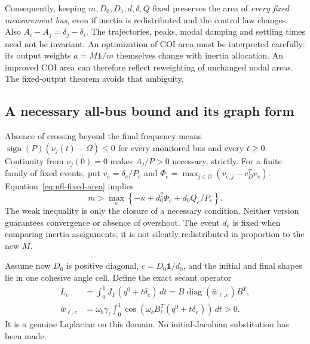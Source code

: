\documentclass[11pt]{article}
\newcommand{\diag}{\operatorname{diag}}
\newcommand{\one}{\mathbf{1}}
\begin{document}
Consequently, keeping $m,D_0,D_1,d,\delta,Q$ fixed preserves the area of
\emph{every fixed measurement bus}, even if inertia is redistributed and
the control law changes. Also
$A_i-A_j=\delta_j-\delta_i$.
The trajectories, peaks, modal damping and settling times need not be
invariant. An optimization of COI area must be interpreted carefully:
its output weights $a=M\one/m$ themselves change with inertia allocation.
An improved COI area can therefore reflect reweighting of unchanged nodal
areas. The fixed-output theorem avoids that ambiguity.

\subsection{A necessary all-bus bound and its graph form}
Absence of crossing beyond the final frequency means
$\operatorname{sign}(P)(\nu_j(t)-\Omega)\leq0$ for every monitored bus and
every $t\geq0$. Continuity from $\nu_j(0)=0$ makes $A_j/P>0$ necessary,
strictly. For a finite family of fixed events, put
$v_e=\delta_e/P_e$ and
$\Phi_e=\max_{j\in\mathcal O}(v_{e,j}-c_D^Tv_e)$.
Equation~\eqref{eq:nfl-fixed-area} implies
\begin{equation}
 \boxed{m>\max_e\left\{-\kappa+d_0^2\Phi_e+
                              d_0 Q_e/P_e\right\}.}
 \label{eq:nfl-general-floor}
\end{equation}
The weak inequality is only the closure of a necessary condition.
Neither version guarantees convergence or absence of overshoot.
The event $d_e$ is fixed when comparing inertia assignments; it is not
silently redistributed in proportion to the new $M$.

Assume now $D_0$ is positive diagonal, $c=D_0\one/d_0$, and the initial
and final shapes lie in one cohesive angle cell. Define the exact secant
operator
\begin{align}
 \bar L_e&=\int_0^1J_F(q^0+t\delta_e)\,dt
          =B\diag(\bar w_{\ell,e})B^T,\\
 \bar w_{\ell,e}
    &=\omega_b\gamma_\ell\int_0^1
          \cos\!\left(\omega_b B_\ell^T(q^0+t\delta_e)\right)\,dt>0.
 \label{eq:nfl-secant}
\end{align}
It is a genuine Laplacian on this domain. No initial-Jacobian substitution
has been made.
\end{document}
